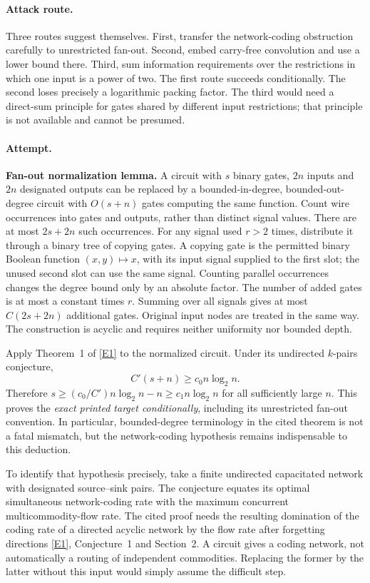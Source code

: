 \documentclass[11pt,a4paper]{article}
\newcommand{\eref}[2]{\hyperlink{extra:#1:#2}{[E#2]}}
\numberwithin{equation}{section}
\begin{document}
\paragraph{Attack route.}
Three routes suggest themselves. First, transfer the network-coding obstruction carefully to unrestricted fan-out. Second, embed carry-free convolution and use a lower bound there. Third, sum information requirements over the restrictions in which one input is a power of two. The first route succeeds conditionally. The second loses precisely a logarithmic packing factor. The third would need a direct-sum principle for gates shared by different input restrictions; that principle is not available and cannot be presumed.

\paragraph{Attempt.}
\textbf{Fan-out normalization lemma.} A circuit with $s$ binary gates, $2n$ inputs and $2n$ designated outputs can be replaced by a bounded-in-degree, bounded-out-degree circuit with $O(s+n)$ gates computing the same function.
Count wire occurrences into gates and outputs, rather than distinct signal values. There are at most $2s+2n$ such occurrences. For any signal used $r>2$ times, distribute it through a binary tree of copying gates. A copying gate is the permitted binary Boolean function $(x,y)\mapsto x$, with its input signal supplied to the first slot; the unused second slot can use the same signal. Counting parallel occurrences changes the degree bound only by an absolute factor. The number of added gates is at most a constant times $r$. Summing over all signals gives at most $C(2s+2n)$ additional gates. Original input nodes are treated in the same way. The construction is acyclic and requires neither uniformity nor bounded depth.

Apply Theorem~1 of \eref{30006781}{1} to the normalized circuit. Under its undirected $k$-pairs conjecture,
\[
 C'(s+n)\ge c_0 n\log_2n.
\]
Therefore $s\ge(c_0/C')n\log_2n-n\ge c_1n\log_2n$ for all sufficiently large $n$. This proves the \emph{exact printed target conditionally}, including its unrestricted fan-out convention. In particular, bounded-degree terminology in the cited theorem is not a fatal mismatch, but the network-coding hypothesis remains indispensable to this deduction.

To identify that hypothesis precisely, take a finite undirected capacitated network with designated source--sink pairs. The conjecture equates its optimal simultaneous network-coding rate with the maximum concurrent multicommodity-flow rate. The cited proof needs the resulting domination of the coding rate of a directed acyclic network by the flow rate after forgetting directions \eref{30006781}{1}, Conjecture~1 and Section~2. A circuit gives a coding network, not automatically a routing of independent commodities. Replacing the former by the latter without this input would simply assume the difficult step.
\end{document}
